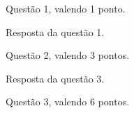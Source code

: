 \documentclass{UnBExam}%
\begin{document}
%
	\begin{questions}%
		\question[1] Questão 1, valendo 1 ponto.
			\begin{resposta}[Resposta]%
				Resposta da questão 1.
			\end{resposta}%
		\question[3] Questão 2, valendo 3 pontos.
			\begin{resposta}%
				Resposta da questão 3.
			\end{resposta}%
		\question[6] Questão 3, valendo 6 pontos.
			\begin{resposta}%
			\end{resposta}%
	\end{questions}%
\end{document}
